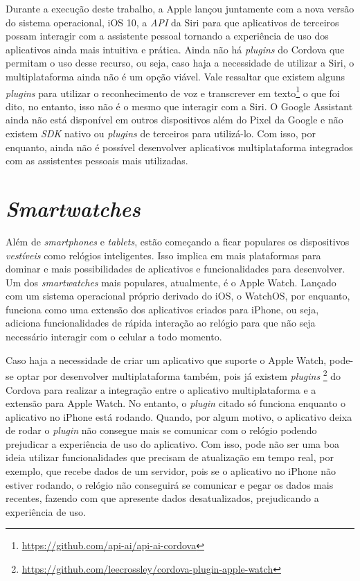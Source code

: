 Durante a execução deste trabalho, a Apple lançou juntamente com a nova versão do sistema operacional, iOS 10, a \textit{API} da Siri para que aplicativos de terceiros possam interagir com a assistente pessoal tornando 
a experiência de uso dos aplicativos ainda mais intuitiva e prática. Ainda não há \textit{plugins} do Cordova que permitam o uso desse recurso, ou seja, caso haja a necessidade de utilizar a Siri, o multiplataforma ainda 
não é um opção viável. Vale ressaltar que existem alguns \textit{plugins} para utilizar o reconhecimento de voz e transcrever em texto\footnote{\url{https://github.com/api-ai/api-ai-cordova}} o que foi dito, no entanto, 
isso não é o mesmo que interagir com a Siri. O Google Assistant ainda não está disponível em outros dispositivos além do Pixel da Google e não existem \textit{SDK} nativo ou \textit{plugins} de terceiros para utilizá-lo. 
Com isso, por enquanto, ainda não é possível desenvolver aplicativos multiplataforma integrados com as assistentes pessoais mais utilizadas.

\section{\textit{Smartwatches}} \label{subsubsec:facial}

Além de \textit{smartphones} e \textit{tablets}, estão começando a ficar populares os dispositivos \textit{vestíveis} como relógios inteligentes. Isso implica em mais plataformas para dominar 
e mais possibilidades de aplicativos e funcionalidades para desenvolver. Um dos \textit{smartwatches} mais populares, atualmente, é o Apple Watch. Lançado com um sistema operacional próprio derivado do iOS, o WatchOS, 
por enquanto, funciona como uma extensão dos aplicativos criados para iPhone, ou seja, adiciona funcionalidades de rápida interação ao relógio para que não seja necessário interagir com o celular a todo momento.

Caso haja a necessidade de criar um aplicativo que suporte o Apple Watch, pode-se optar por desenvolver multiplataforma também, pois já existem \textit{plugins}
\footnote{\url{https://github.com/leecrossley/cordova-plugin-apple-watch}} do Cordova para realizar a integração entre o aplicativo multiplataforma e a extensão para Apple Watch. No entanto, o \textit{plugin} 
citado só funciona enquanto o aplicativo no iPhone está rodando. Quando, por algum motivo, o aplicativo deixa de rodar o \textit{plugin} não consegue mais se comunicar com o relógio podendo prejudicar a experiência 
de uso do aplicativo. Com isso, pode não ser uma boa ideia utilizar funcionalidades que precisam de atualização em tempo real, por exemplo, que recebe dados de um servidor, pois se o aplicativo no iPhone não 
estiver rodando, o relógio não conseguirá se comunicar e pegar os dados mais recentes, fazendo com 
que apresente dados desatualizados, prejudicando a experiência de uso.

